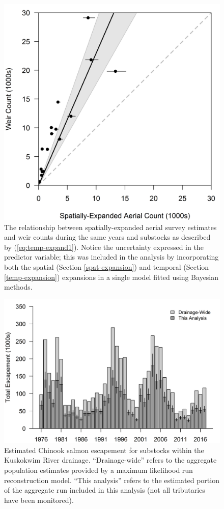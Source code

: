 \documentclass[12pt,]{book}
\theoremstyle{definition}
\theoremstyle{definition}
\theoremstyle{definition}
\theoremstyle{remark}
\begin{document}
\begin{figure}
  \centering
  \includegraphics{img/Ch4/obs-correct.png}
  \caption{The relationship between spatially-expanded aerial survey estimates and weir counts during the same years and substocks as described by (\ref{eq:temp-expand1}). Notice the uncertainty expressed in the predictor variable; this was included in the analysis by incorporating both the spatial (Section \ref{spat-expansion}) and temporal (Section \ref{temp-expansion}) expansions in a single model fitted using Bayesian methods.}
  \label{fig:obs-correct}
\end{figure}

\clearpage

\begin{figure}
  \centering
  \includegraphics{img/Ch4/obs-fraction.png}
  \caption{Estimated Chinook salmon escapement for substocks within the Kuskokwim River drainage. ``Drainage-wide'' refers to the aggregate population estimates provided by a maximum likelihood run reconstruction model. ``This analysis'' refers to the estimated portion of the aggregate run included in this analysis (not all tributaries have been monitored).}
  \label{fig:obs-fraction}
\end{figure}
\end{document}
